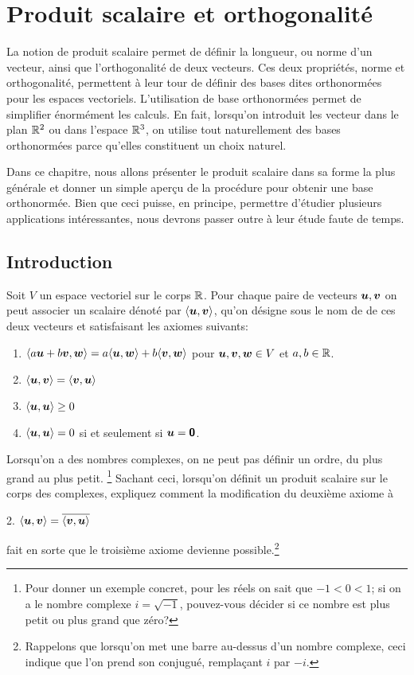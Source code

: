 \chapter{Produit scalaire et orthogonalité} \label{chap:produit}
La notion de produit scalaire permet de définir la longueur, ou norme d'un vecteur, ainsi que l'orthogonalité de deux vecteurs.
Ces deux propriétés, norme et orthogonalité, permettent à leur tour de définir des bases dites orthonormées pour les espaces vectoriels.
L'utilisation de base orthonormées permet de simplifier énormément les calculs. En fait, lorsqu'on introduit les vecteur dans le plan $\mathbb{R}^2$ ou dans l'espace $\mathbb{R}^3$, on utilise tout naturellement des bases
orthonormées parce qu'elles constituent un choix naturel.

Dans ce chapitre, nous allons présenter le produit scalaire dans sa forme la plus générale et donner un simple aperçu
de la procédure pour obtenir une base orthonormée.  Bien que ceci puisse, en principe, permettre d'étudier
plusieurs applications intéressantes, nous devrons passer outre à leur étude faute de temps.
\section{Introduction}
\begin{defini}
Soit $V$ un espace vectoriel sur le corps $\mathbb{R}$. 
Pour chaque paire de vecteurs $\boldsymbol{u}, \boldsymbol{v}$ 
on peut associer un scalaire dénoté par 
$\langle\boldsymbol{u}, \boldsymbol{v}\rangle $,
qu'on désigne sous le nom de  de ces deux vecteurs et 
satisfaisant les axiomes suivants:
\begin{enumerate}
\item $\langle a\boldsymbol{u} + b\boldsymbol{v}, \boldsymbol{w} \rangle = a \langle\boldsymbol{u}, \boldsymbol{w}\rangle + b\langle\boldsymbol{v}, \boldsymbol{w}\rangle $ pour 
$\boldsymbol{u}, \boldsymbol{v}, \boldsymbol{w} \in V$ et $a, b \in \mathbb{R}$.
\item$ \langle\boldsymbol{u}, \boldsymbol{v}\rangle = \langle\boldsymbol{v}, \boldsymbol{u}\rangle$
\item $\langle \boldsymbol{u}, \boldsymbol{u}\rangle \geq 0$
\item $\langle \boldsymbol{u}, \boldsymbol{u}\rangle = 0$ si et seulement si $\boldsymbol{u} = \mbox{\textsf{\textbf{{0}}}}$.
\end{enumerate}
\end{defini}

\begin{exerciceB}\label{ex:scalaire1}
Lorsqu'on a des nombres complexes, on ne peut pas définir un ordre, du plus grand au plus 
petit. \footnote{Pour donner un exemple concret, pour les réels on sait que $-1 < 0 < 1$; si 
on a le nombre complexe $i=\sqrt{-1}$, pouvez-vous décider si ce nombre est plus petit ou plus 
grand que zéro?} 
Sachant ceci, lorsqu'on définit un produit scalaire sur le corps
des complexes, expliquez comment la modification du deuxième axiome à

2. $ \langle\boldsymbol{u}, \boldsymbol{v}\rangle = \overline{\langle\boldsymbol{v}, \boldsymbol{u}\rangle}$

\noindent fait en sorte que le troisième axiome devienne possible.\footnote{Rappelons que
lorsqu'on met une barre au-dessus d'un nombre complexe, ceci indique que l'on prend son 
conjugué, remplaçant $i$ par $-i$.}
\end{exerciceB}

